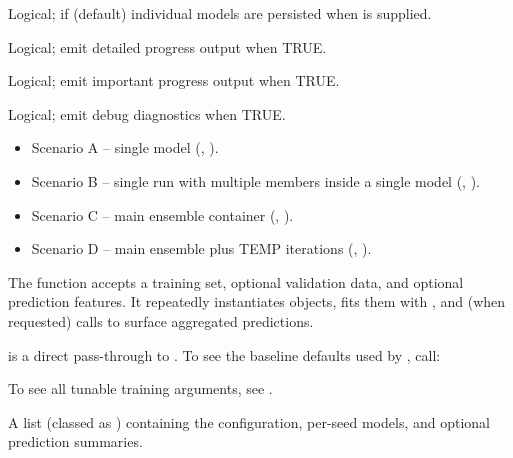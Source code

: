\documentclass[a4paper]{book}
\begin{document}
\begin{Arguments}
\begin{ldescription}
\item[\code{save\_models}] Logical; if  (default) individual models are
persisted when  is supplied.

\item[\code{verbose}] Logical; emit detailed progress output when TRUE.

\item[\code{verboseLow}] Logical; emit important progress output when TRUE.

\item[\code{debug}] Logical; emit debug diagnostics when TRUE.
\end{ldescription}
\end{Arguments}
%
\begin{Details}
\begin{itemize}

\item{} Scenario A – single model (, ).
\item{} Scenario B – single run with multiple members inside a single model
(, ).
\item{} Scenario C – main ensemble container (,
).
\item{} Scenario D – main ensemble plus TEMP iterations (,
).

\end{itemize}


The function accepts a training set, optional validation data, and optional
prediction features. It repeatedly instantiates  objects,
fits them with , and (when requested) calls
 to surface aggregated predictions.


 is a direct pass-through to . To see the
baseline defaults used by , call:


To see all tunable training arguments, see .
\end{Details}
%
\begin{Value}
A list (classed as ) containing the
configuration, per-seed models, and optional prediction summaries.
\end{Value}
\end{document}
